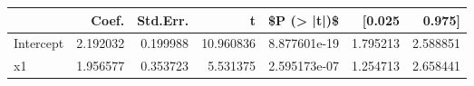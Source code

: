 \begin{tabular}{lrrrrrr}
\toprule
{} &     Coef. &  Std.Err. &          t &   \$P (> |t|)\$ &    [0.025 &    0.975] \\
\midrule
Intercept &  2.192032 &  0.199988 &  10.960836 &  8.877601e-19 &  1.795213 &  2.588851 \\
x1        &  1.956577 &  0.353723 &   5.531375 &  2.595173e-07 &  1.254713 &  2.658441 \\
\bottomrule
\end{tabular}
